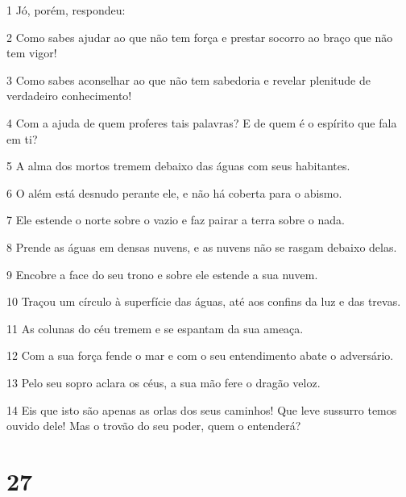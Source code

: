\par 1 Jó, porém, respondeu:
\par 2 Como sabes ajudar ao que não tem força e prestar socorro ao braço que não tem vigor!
\par 3 Como sabes aconselhar ao que não tem sabedoria e revelar plenitude de verdadeiro conhecimento!
\par 4 Com a ajuda de quem proferes tais palavras? E de quem é o espírito que fala em ti?
\par 5 A alma dos mortos tremem debaixo das águas com seus habitantes.
\par 6 O além está desnudo perante ele, e não há coberta para o abismo.
\par 7 Ele estende o norte sobre o vazio e faz pairar a terra sobre o nada.
\par 8 Prende as águas em densas nuvens, e as nuvens não se rasgam debaixo delas.
\par 9 Encobre a face do seu trono e sobre ele estende a sua nuvem.
\par 10 Traçou um círculo à superfície das águas, até aos confins da luz e das trevas.
\par 11 As colunas do céu tremem e se espantam da sua ameaça.
\par 12 Com a sua força fende o mar e com o seu entendimento abate o adversário.
\par 13 Pelo seu sopro aclara os céus, a sua mão fere o dragão veloz.
\par 14 Eis que isto são apenas as orlas dos seus caminhos! Que leve sussurro temos ouvido dele! Mas o trovão do seu poder, quem o entenderá?

\chapter{27}

